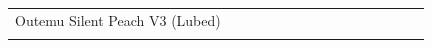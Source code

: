 \documentclass[a4paper]{article}
\begin{document}
\pagestyle{empty}
\begin{center}
\fontsize{7}{9}\selectfont
{\selectfont
\begin{tabular}{ : *{15}{C{1.19cm}:} }
\hdashline
Outemu Silent Peach V3 (Lubed) &  &  &  &  &  &  &  &  &  &  &  &  &  &  \\ 
\hdashline
\end{tabular}
}
\end{center}
\end{document}
